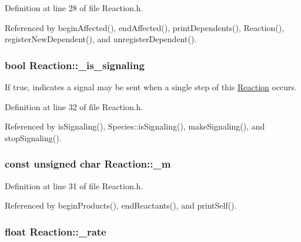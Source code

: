 Definition at line 28 of file Reaction.\-h.



Referenced by begin\-Affected(), end\-Affected(), print\-Dependents(), Reaction(), register\-New\-Dependent(), and unregister\-Dependent().

\hypertarget{classReaction_a30ab995e2fa94706c6b5553b4a7dda7a}{
\subsubsection[{\-\_\-is\-\_\-signaling}]{\setlength{\rightskip}{0pt plus 5cm}bool {\bf Reaction\-::\-\_\-is\-\_\-signaling}}}\label{classReaction_a30ab995e2fa94706c6b5553b4a7dda7a}


If true, indicates a signal may be sent when a single step of this \hyperlink{classReaction}{Reaction} occurs. 



Definition at line 32 of file Reaction.\-h.



Referenced by is\-Signaling(), Species\-::is\-Signaling(), make\-Signaling(), and stop\-Signaling().

\hypertarget{classReaction_a1579bd969edef356d3424ae6f88cf1f3}{
\subsubsection[{\-\_\-m}]{\setlength{\rightskip}{0pt plus 5cm}const unsigned char {\bf Reaction\-::\-\_\-m}}}\label{classReaction_a1579bd969edef356d3424ae6f88cf1f3}


Definition at line 31 of file Reaction.\-h.



Referenced by begin\-Products(), end\-Reactants(), and print\-Self().

\hypertarget{classReaction_a78884531e50137c548b7d9ab504aa032}{
\subsubsection[{\-\_\-rate}]{\setlength{\rightskip}{0pt plus 5cm}float {\bf Reaction\-::\-\_\-rate}}}\label{classReaction_a78884531e50137c548b7d9ab504aa032}


